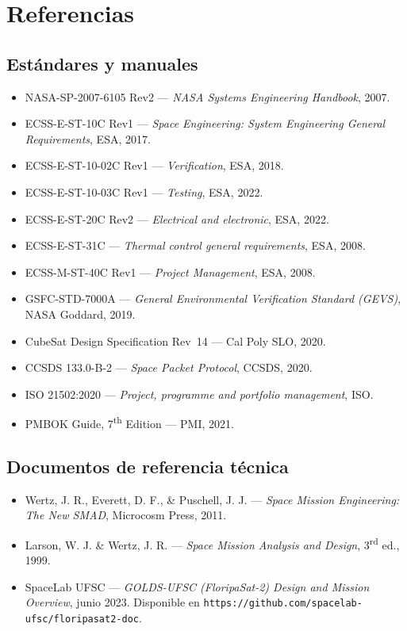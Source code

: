 \chapter{Referencias}

\section*{Estándares y manuales}
\begin{itemize}
    \item NASA-SP-2007-6105 Rev2 — \textit{NASA Systems Engineering Handbook}, 2007.
    \item ECSS-E-ST-10C Rev1 — \textit{Space Engineering: System Engineering General Requirements}, ESA, 2017.
    \item ECSS-E-ST-10-02C Rev1 — \textit{Verification}, ESA, 2018.
    \item ECSS-E-ST-10-03C Rev1 — \textit{Testing}, ESA, 2022.
    \item ECSS-E-ST-20C Rev2 — \textit{Electrical and electronic}, ESA, 2022.
    \item ECSS-E-ST-31C — \textit{Thermal control general requirements}, ESA, 2008.
    \item ECSS-M-ST-40C Rev1 — \textit{Project Management}, ESA, 2008.
    \item GSFC-STD-7000A — \textit{General Environmental Verification Standard (GEVS)}, NASA Goddard, 2019.
    \item CubeSat Design Specification Rev~14 — Cal Poly SLO, 2020.
    \item CCSDS 133.0-B-2 — \textit{Space Packet Protocol}, CCSDS, 2020.
    \item ISO 21502:2020 — \textit{Project, programme and portfolio management}, ISO.
    \item PMBOK Guide, 7\textsuperscript{th} Edition — PMI, 2021.
\end{itemize}

\section*{Documentos de referencia técnica}
\begin{itemize}
    \item Wertz, J. R., Everett, D. F., \& Puschell, J. J. — \textit{Space Mission Engineering: The New SMAD}, Microcosm Press, 2011.
    \item Larson, W. J. \& Wertz, J. R. — \textit{Space Mission Analysis and Design}, 3\textsuperscript{rd} ed., 1999.
    \item SpaceLab UFSC — \textit{GOLDS-UFSC (FloripaSat-2) Design and Mission Overview}, junio 2023. Disponible en \texttt{https://github.com/spacelab-ufsc/floripasat2-doc}.
\end{itemize}

